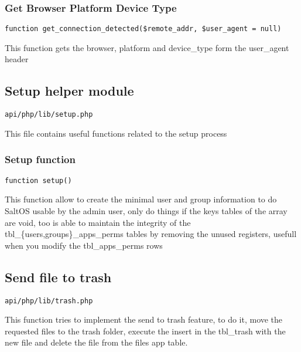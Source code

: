 \documentclass[a4paper]{article}
\begin{document}
\hypertarget{toc526}{}
\subsubsection{Get Browser Platform Device Type}

\begin{lstlisting}
function get_connection_detected($remote_addr, $user_agent = null)
\end{lstlisting}

This function gets the browser, platform and device\_type form the user\_agent header

\hypertarget{toc527}{}
\subsection{Setup helper module}

\begin{lstlisting}
api/php/lib/setup.php
\end{lstlisting}

This file contains useful functions related to the setup process

\hypertarget{toc528}{}
\subsubsection{Setup function}

\begin{lstlisting}
function setup()
\end{lstlisting}

This function allow to create the minimal user and group information to do SaltOS
usable by the admin user, only do things if the keys tables of the array are void,
too is able to maintain the integrity of the tbl\_\{users,groups\}\_apps\_perms tables
by removing the unused registers, usefull when you modify the tbl\_apps\_perms rows

\hypertarget{toc529}{}
\subsection{Send file to trash}

\begin{lstlisting}
api/php/lib/trash.php
\end{lstlisting}

This function tries to implement the send to trash feature, to do it, move the
requested files to the trash folder, execute the insert in the tbl\_trash with
the new file and delete the file from the files app table.
\end{document}

